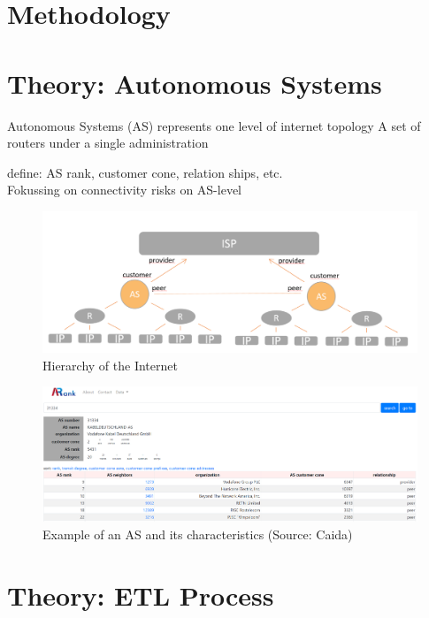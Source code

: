 \documentclass[conference]{IEEEtran}
\begin{document}
\section{Methodology}

\section{Theory: Autonomous Systems}

Autonomous Systems (AS) represents one level of internet topology
A set of routers under a single administration

define: AS rank, customer cone, relation ships, etc. \\


Fokussing on connectivity risks on AS-level 






\begin{figure}[htbp]
\centerline{\includegraphics[scale=0.25]{Graphics/hierarchy.PNG}}
\caption{Hierarchy of the Internet}
\label{fig}
\end{figure}

\begin{figure}[htbp]
\centerline{\includegraphics[scale=0.15]{Graphics/asExample.PNG}}
\caption{Example of an AS and its characteristics (Source: Caida)}
\label{fig}
\end{figure}



\section{Theory: ETL Process}
\end{document}
